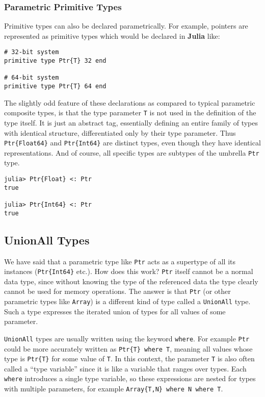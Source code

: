\documentclass[
]{article}
\begin{document}
\hypertarget{parametric-primitive-types}{%
\subsubsection{Parametric Primitive
Types}\label{parametric-primitive-types}}

Primitive types can also be declared parametrically. For example,
pointers are represented as primitive types which would be declared in
\textbf{Julia} like:

\begin{verbatim}
# 32-bit system
primitive type Ptr{T} 32 end

# 64-bit system
primitive type Ptr{T} 64 end
\end{verbatim}

The slightly odd feature of these declarations as compared to typical
parametric composite types, is that the type parameter \texttt{T} is not
used in the definition of the type itself. It is just an abstract tag,
essentially defining an entire family of types with identical structure,
differentiated only by their type parameter. Thus
\texttt{Ptr\{Float64\}} and \texttt{Ptr\{Int64\}} are distinct types,
even though they have identical representations. And of course, all
specific types are subtypes of the umbrella \texttt{Ptr} type.

\begin{verbatim}
julia> Ptr{Float} <: Ptr
true

julia> Ptr{Int64} <: Ptr
true
\end{verbatim}

\hypertarget{unionall-types}{%
\subsection{UnionAll Types}\label{unionall-types}}

We have said that a parametric type like \texttt{Ptr} acts as a
supertype of all its instances (\texttt{Ptr\{Int64\}} etc.). How does
this work? \texttt{Ptr} itself cannot be a normal data type, since
without knowing the type of the referenced data the type clearly cannot
be used for memory operations. The answer is that \texttt{Ptr} (or other
parametric types like \texttt{Array}) is a different kind of type called
a \texttt{UnionAll} type. Such a type expresses the iterated union of
types for all values of some parameter.

\texttt{UnionAll} types are usually written using the keyword
\texttt{where}. For example \texttt{Ptr} could be more accurately
written as \texttt{Ptr\{T\}\ where\ T}, meaning all values whose type is
\texttt{Ptr\{T\}} for some value of \texttt{T}. In this context, the
parameter \texttt{T} is also often called a ``type variable'' since it
is like a variable that ranges over types. Each \texttt{where}
introduces a single type variable, so these expressions are nested for
types with multiple parameters, for example
\texttt{Array\{T,N\}\ where\ N\ where\ T}.
\end{document}
